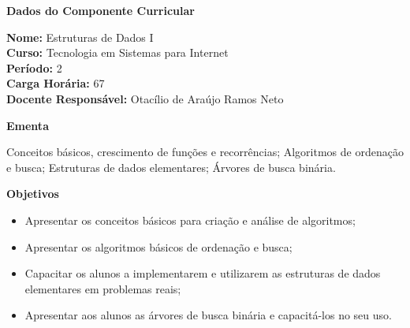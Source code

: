 

\begin{snugshade}\begin{center}\textbf{
	Dados do Componente Curricular
}\end{center}\end{snugshade}

\noindent 	\textbf{Nome:} Estruturas de Dados I
\\ 			\textbf{Curso:} Tecnologia em Sistemas para Internet
\\ 			\textbf{Período:} \unit{2}{\degree}
\\ 			\textbf{Carga Horária:} \unit{67}{\hour}
\\ 			\textbf{Docente Responsável:} Otacílio de Araújo Ramos Neto


\begin{snugshade}\begin{center}\textbf{
    Ementa
\vphantom{q}}\end{center}\end{snugshade}

\noindent
Conceitos básicos, crescimento de funções e recorrências; Algoritmos de ordenação e busca; Estruturas de dados elementares; Árvores de busca binária.

\begin{snugshade}\begin{center}\textbf{
    Objetivos
}\end{center}\end{snugshade}

\begin{itemize}

\item Apresentar os conceitos básicos para criação e análise de algoritmos;
\item Apresentar os algoritmos básicos de ordenação e busca;
\item Capacitar os alunos a implementarem e utilizarem as estruturas de dados elementares em problemas reais;
\item Apresentar aos alunos as árvores de busca binária e capacitá-los no seu uso.

\end{itemize} 



